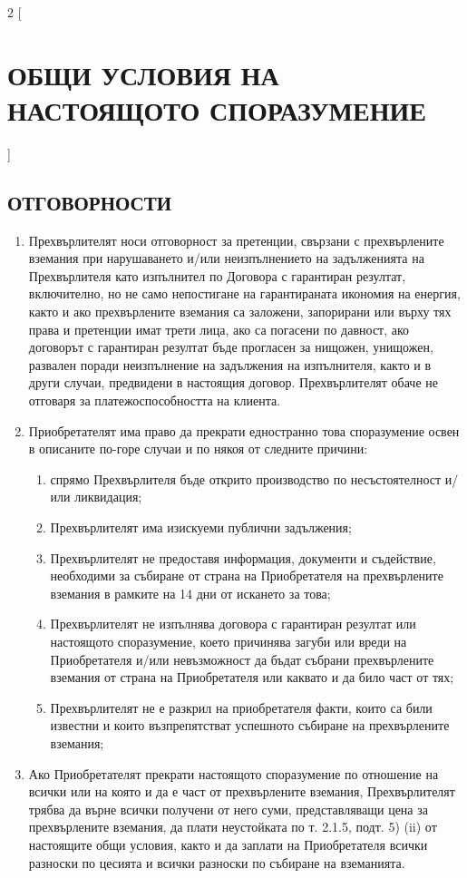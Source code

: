 \begin{multicols}{2} [\section{ОБЩИ УСЛОВИЯ НА НАСТОЯЩОТО
    СПОРАЗУМЕНИЕ}]
  \subsection{ОТГОВОРНОСТИ}
  \begin{enumerate}
  \item Прехвърлителят носи отговорност за претенции, свързани с
    прехвърлените вземания при нарушаването и/или неизпълнението на
    задълженията на Прехвърлителя като изпълнител по Договора с
    гарантиран резултат, включително, но не само непостигане на
    гарантираната икономия на енергия, както и ако прехвърлените
    вземания са заложени, запорирани или върху тях права и претенции
    имат трети лица, ако са погасени по давност, ако договорът с
    гарантиран резултат бъде прогласен за нищожен, унищожен, развален
    поради неизпълнение на задължения на изпълнителя, както и в други
    случаи, предвидени в настоящия договор. Прехвърлителят обаче не
    отговаря за платежоспособността на клиента.
  \item Приобретателят има право да прекрати едностранно това
    споразумение освен в описаните по-горе случаи и по някоя от
    следните причини:
    \begin{enumerate}
    \item спрямо Прехвърлителя бъде открито производство по
      несъстоятелност и/или ликвидация;
    \item Прехвърлителят има изискуеми публични задължения;
    \item Прехвърлителят не предоставя информация, документи и
      съдействие, необходими за събиране от страна на Приобретателя на
      прехвърлените вземания в рамките на 14 дни от искането за това;
    \item Прехвърлителят не изпълнява договора с гарантиран резултат
      или настоящото споразумение, което причинява загуби или вреди на
      Приобретателя и/или невъзможност да бъдат събрани прехвърлените
      вземания от страна на Приобретателя или каквато и да било част
      от тях;
    \item Прехвърлителят не е разкрил на приобретателя факти, които са
      били известни и които възпрепятстват успешното събиране на
      прехвърлените вземания;
    \end{enumerate}
  \item Ако Приобретателят прекрати настоящото споразумение по
    отношение на всички или на която и да е част от прехвърлените
    вземания, Прехвърлителят трябва да върне всички получени от него
    суми, представляващи цена за прехвърлените вземания, да плати
    неустойката по т. 2.1.5, подт. 5) (ii) от настоящите общи условия,
    както и да заплати на Приобретателя всички разноски по цесията и
    всички разноски по събиране на вземанията.
  \end{enumerate}


\end{multicols}
